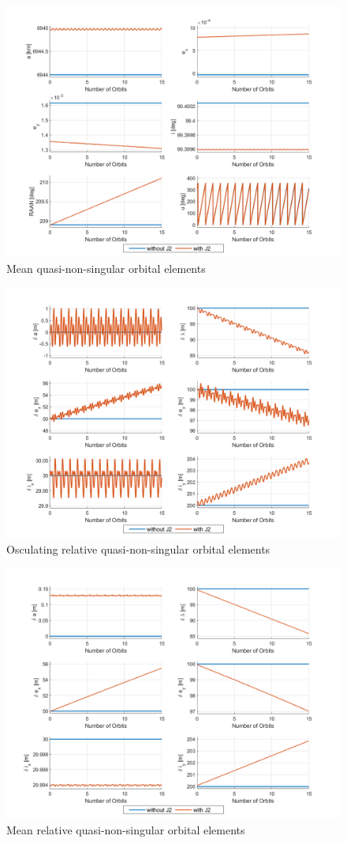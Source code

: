 \begin{figure}[H]
    \centering
    \includegraphics[width=0.75\linewidth]{sim/figures/PS4/OE_abs_mean_SV2.png}
    \caption{Mean quasi-non-singular orbital elements}
    \label{fig:mean_OE}
\end{figure}

\begin{figure}[H]
    \centering
    \includegraphics[width=0.75\linewidth]{sim/figures/PS4/ROE_osc_SV2.png}
    \caption{Osculating relative quasi-non-singular orbital elements}
    \label{fig:osc_ROE}
\end{figure}

\begin{figure}[H]
    \centering
    \includegraphics[width=0.75\linewidth]{sim/figures/PS4/ROE_mean_SV2.png}
    \caption{Mean relative quasi-non-singular orbital elements}
    \label{fig:mean_ROE}
\end{figure}

